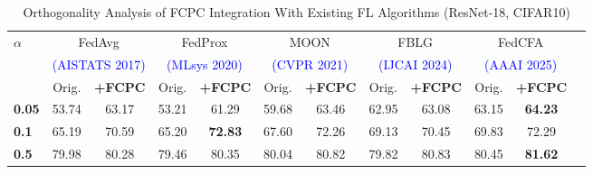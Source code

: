 \documentclass[journal,twoside,web]{ieeecolor}
\begin{document}
\begin{table}[htbp]
\caption{Orthogonality Analysis of FCPC Integration With Existing FL Algorithms (ResNet-18, CIFAR10)}
\label{tab:add FCPC}
\centering
\footnotesize
\setlength{\tabcolsep}{4pt} %
\begin{tabular}{@{}l *{5}{c c} c@{}}
\toprule
\textbf{$\alpha$}  & \multicolumn{2}{c}{FedAvg} & \multicolumn{2}{c}{FedProx} & \multicolumn{2}{c}{MOON} & \multicolumn{2}{c}{FBLG}  & \multicolumn{2}{c}{FedCFA}\\
& \multicolumn{2}{c}{\textcolor{blue}{\scriptsize (AISTATS 2017)}} & \multicolumn{2}{c}{\textcolor{blue}{\scriptsize (MLsys 2020)}} & \multicolumn{2}{c}{\textcolor{blue}{\scriptsize(CVPR 2021)}} & \multicolumn{2}{c}{\textcolor{blue}{\scriptsize(IJCAI 2024)}}  & \multicolumn{2}{c}{\textcolor{blue}{\scriptsize(AAAI 2025)}}\\
\cmidrule(lr){2-3} \cmidrule(lr){4-5} \cmidrule(lr){6-7} \cmidrule(lr){8-9} \cmidrule(lr){10-11}
& Orig. & \textbf{\scriptsize +FCPC} & Orig. & \textbf{\scriptsize +FCPC} & Orig. &\textbf{\scriptsize +FCPC} & Orig. & \textbf{\scriptsize +FCPC} & Orig. & \textbf{\scriptsize +FCPC} \\
\midrule
\textbf{0.05} & 53.74 & 63.17 & 53.21 & 61.29 & 59.68 & 63.46  & 62.95 & 63.08 & 63.15 & \textbf{64.23} \\
\textbf{0.1}  & 65.19 & 70.59 & 65.20 & \textbf{72.83} & 67.60 & 72.26  & 69.13 & 70.45 & 69.83 & 72.29\\
\textbf{0.5}  & 79.98 & 80.28 & 79.46 & 80.35 & 80.04 & 80.82 & 79.82 & 80.83  & 80.45 &\textbf{81.62}  \\
\bottomrule
\end{tabular}

\end{table}








\end{document}
